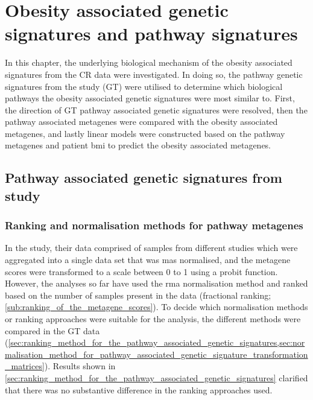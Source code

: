 \chapter{Obesity associated genetic signatures and pathway signatures}
\label{cha:obesity_associated_genetic_signature_and_pathway_signatures}

In this chapter, the underlying biological mechanism of the obesity associated signatures from the CR data were investigated.
In doing so, the pathway genetic signatures from the \citet{Gatza2010a} study (GT) were utilised to determine which biological pathways the obesity associated genetic signatures were most similar to.
First, the direction of GT pathway associated genetic signatures were resolved, then the pathway associated metagenes were compared with the obesity associated metagenes, and lastly linear models were constructed based on the pathway metagenes and patient \gls{bmi} to predict the obesity associated metagenes.

\section{Pathway associated genetic signatures from \citet{Gatza2010a} study}
\label{sec:pathway_associated_genetic_signatures_from_gatza2010a_study}

\subsection{Ranking and normalisation methods for pathway metagenes}
\label{sub:ranking_and_normalisation_methods}

In the \citet{Gatza2010a} study, their data comprised of samples from different studies which were aggregated into a single data set that was \gls{mas} normalised, and the metagene scores were transformed to a scale between 0 to 1 using a probit function.
However, the analyses so far have used the \gls{rma} normalisation method and ranked based on the number of samples present in the data (fractional ranking; \cref{sub:ranking_of_the_metagene_scores}).
To decide which normalisation methods or ranking approaches were suitable for the analysis, the different methods were compared in the GT data (\cref{sec:ranking_method_for_the_pathway_associated_genetic_signatures,sec:normalisation_method_for_pathway_associated_genetic_signature_transformation_matrices}).
Results shown in \cref{sec:ranking_method_for_the_pathway_associated_genetic_signatures} clarified that there was no substantive difference in the ranking approaches used.

